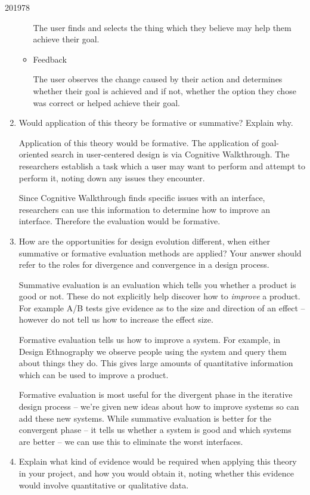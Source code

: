 \documentclass[10pt,\jkfside,a4paper]{article}
\begin{document}
\begin{examquestion}{2019}{7}{8}
\begin{enumerate}
\begin{itemize}
The user finds and selects the thing which they believe may help them
achieve their goal.

\item Feedback

The user observes the change caused by their action and determines whether
their goal is achieved and if not, whether the option they chose was
correct or helped achieve their goal.

\end{itemize}

\item Would application of this theory be formative or summative? Explain why.

Application of this theory would be formative. The application of
goal-oriented search in user-centered design is via Cognitive Walkthrough.
The researchers establish a task which a user may want to perform and
attempt to perform it, noting down any issues they encounter.

Since Cognitive Walkthrough finds specific issues with an interface,
researchers can use this information to determine how to improve an
interface. Therefore the evaluation would be formative.

\item How are the opportunities for design evolution different, when either
summative or formative evaluation methods are applied? Your answer should
refer to the roles for divergence and convergence in a design process.

Summative evaluation is an evaluation which tells you whether a product is
good or not. These do not explicitly help discover how to \textit{improve}
a product. For example A/B tests give evidence as to the size and direction
of an effect -- however do not tell us how to increase the effect size.

Formative evaluation tells us how to improve a system. For example, in
Design Ethnography we observe people using the system and query them about
things they do. This gives large amounts of quantitative information which
can be used to improve a product.

Formative evaluation is most useful for the divergent phase in the
iterative design process -- we're given new ideas about how to improve
systems so can add these new systems. While summative evaluation is better
for the convergent phase -- it tells us whether a system is good and which
systems are better -- we can use this to eliminate the worst interfaces.

\item Explain what kind of evidence would be required when applying this
theory in your project, and how you would obtain it, noting whether this
evidence would involve quantitative or qualitative data.


\end{enumerate}
\end{examquestion}
\end{document}
